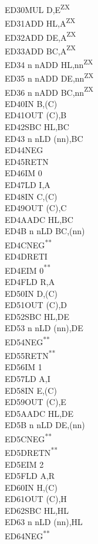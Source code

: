 \documentclass[12pt,twoside,openright,a4paper]{book}
\newcommand{\UNDOC}{\textnormal{\textsuperscript{**}}}
\newcommand{\ZXN}{\textnormal{\textsuperscript{ZX}}}
\begin{document}
\begin{multicols}{3}
{\begin{tabbing}
	ED30\>MUL D,E\ZXN\\
	ED31\>ADD HL,A\ZXN\\
	ED32\>ADD DE,A\ZXN\\
	ED33\>ADD BC,A\ZXN\\
	ED34 n n\>ADD HL,nn\ZXN\\
	ED35 n n\>ADD DE,nn\ZXN\\
	ED36 n n\>ADD BC,nn\ZXN\\
	ED40\>IN B,(C)\\
	ED41\>OUT (C),B\\
	ED42\>SBC HL,BC\\
	ED43 n n\>LD (nn),BC\\
	ED44\>NEG\\
	ED45\>RETN\\
	ED46\>IM 0\\
	ED47\>LD I,A\\
	ED48\>IN C,(C)\\
	ED49\>OUT (C),C\\
	ED4A\>ADC HL,BC\\
	ED4B n n\>LD BC,(nn)\\
	ED4C\>NEG\UNDOC\\
	ED4D\>RETI\\
	ED4E\>IM 0\UNDOC\\
	ED4F\>LD R,A\\
	ED50\>IN D,(C)\\
	ED51\>OUT (C),D\\
	ED52\>SBC HL,DE\\
	ED53 n n\>LD (nn),DE\\
	ED54\>NEG\UNDOC\\
	ED55\>RETN\UNDOC\\
	ED56\>IM 1\\
	ED57\>LD A,I\\
	ED58\>IN E,(C)\\
	ED59\>OUT (C),E\\
	ED5A\>ADC HL,DE\\
	ED5B n n\>LD DE,(nn)\\
	ED5C\>NEG\UNDOC\\
	ED5D\>RETN\UNDOC\\
	ED5E\>IM 2\\
	ED5F\>LD A,R\\
	ED60\>IN H,(C)\\
	ED61\>OUT (C),H\\
	ED62\>SBC HL,HL\\
	ED63 n n\>LD (nn),HL\\
	ED64\>NEG\UNDOC\\

\end{tabbing}}
\end{multicols}
\end{document}
